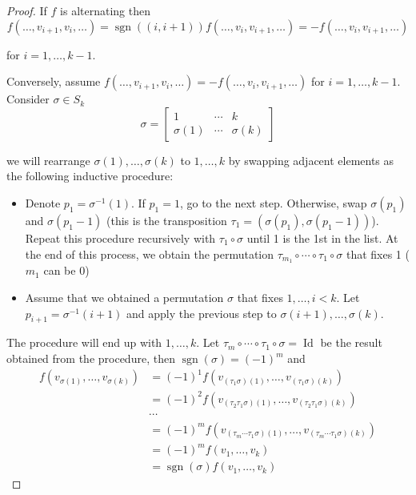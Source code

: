 \begin{proof}
	If \( f \) is alternating then
	\[
		f(\ldots, v_{i+1}, v_{i}, \ldots) = \operatorname{sgn}((i,i+1)) f(\ldots, v_{i}, v_{i+1}, \ldots) = -f(\ldots, v_{i}, v_{i+1}, \ldots)
	\]

	for \( i = 1, \ldots, k-1 \).

	Conversely, assume \( f(\ldots, v_{i+1}, v_{i}, \ldots) = -f(\ldots, v_{i}, v_{i+1}, \ldots) \) for \( i = 1, \ldots, k-1 \). Consider \( \sigma \in S_{k} \)
	\[
		\sigma = \begin{bmatrix}
			1         & \cdots & k         \\
			\sigma(1) & \cdots & \sigma(k)
		\end{bmatrix}
	\]

	we will rearrange \( \sigma(1), \ldots, \sigma(k) \) to \( 1, \ldots, k \) by swapping adjacent elements as the following inductive procedure:
	\begin{itemize}
		\item Denote \( p_{1} = \sigma^{-1}(1) \). If \( p_{1} = 1 \), go to the next step. Otherwise, swap \( \sigma(p_{1}) \) and \( \sigma(p_{1} - 1) \) (this is the transposition \( \tau_{1} = (\sigma(p_{1}), \sigma(p_{1} - 1)) \)). Repeat this procedure recursively with \( \tau_{1} \circ \sigma \) until 1 is the 1st in the list. At the end of this process, we obtain the permutation \( \tau_{m_{1}}\circ \cdots \circ \tau_{1}\circ \sigma \) that fixes 1 (\( m_{1}\) can be 0)
		\item Assume that we obtained a permutation \( \sigma \) that fixes \( 1, \ldots, i < k \). Let \( p_{i+1} = \sigma^{-1}(i + 1) \) and apply the previous step to \( \sigma(i+1), \ldots, \sigma(k) \).
	\end{itemize}

	The procedure will end up with \( 1, \ldots, k \). Let \( \tau_{m} \circ \cdots \circ \tau_{1} \circ \sigma = \operatorname{Id} \) be the result obtained from the procedure, then \( \operatorname{sgn}(\sigma) = {(-1)}^{m} \) and
	\begingroup
	\allowdisplaybreaks%
	\begin{align*}
		f(v_{\sigma(1)}, \ldots, v_{\sigma(k)}) & = {(-1)}^{1} f(v_{(\tau_{1}\sigma)(1)}, \ldots, v_{(\tau_{1}\sigma)(k)})                             \\
		                                        & = {(-1)}^{2} f(v_{(\tau_{2}\tau_{1}\sigma)(1)}, \ldots, v_{(\tau_{2}\tau_{1}\sigma)(k)})             \\
		                                        & \cdots                                                                                               \\
		                                        & = {(-1)}^{m} f(v_{(\tau_{m}\cdots\tau_{1}\sigma)(1)}, \ldots, v_{(\tau_{m}\cdots\tau_{1}\sigma)(k)}) \\
		                                        & = {(-1)}^{m} f(v_{1}, \ldots, v_{k})                                                                 \\
		                                        & = \operatorname{sgn}(\sigma) f(v_{1}, \ldots, v_{k})
	\end{align*}
	\endgroup


\end{proof}
